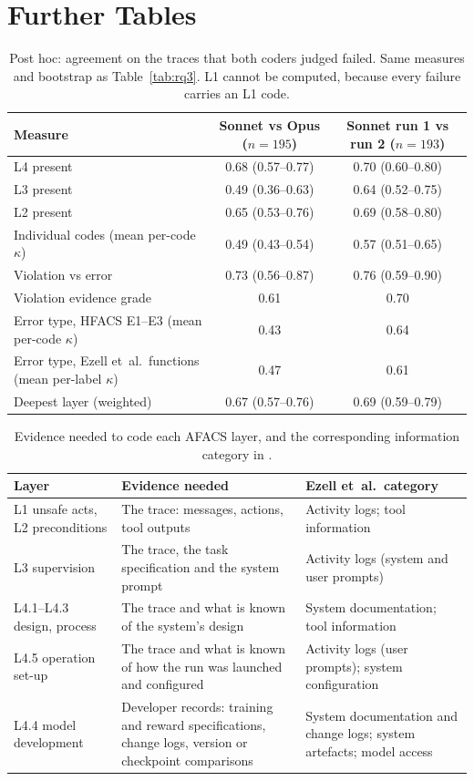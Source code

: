 \documentclass[10pt]{article}
\begin{document}
\section{Further Tables}
\label{app:tables}

\begin{table}[tbp]
\centering
\caption{Post hoc: agreement on the traces that both coders judged failed. Same measures and bootstrap as Table~\ref{tab:rq3}. L1 cannot be computed, because every failure carries an L1 code.}
\label{tab:bothfailed}
\small
\begin{tabular}{@{}lcc@{}}
\toprule
Measure & Sonnet vs Opus ($n=195$) & Sonnet run 1 vs run 2 ($n=193$)\\
\midrule
L4 present & 0.68 (0.57--0.77) & 0.70 (0.60--0.80)\\
L3 present & 0.49 (0.36--0.63) & 0.64 (0.52--0.75)\\
L2 present & 0.65 (0.53--0.76) & 0.69 (0.58--0.80)\\
Individual codes (mean per-code $\kappa$) & 0.49 (0.43--0.54) & 0.57 (0.51--0.65)\\
Violation vs error & 0.73 (0.56--0.87) & 0.76 (0.59--0.90)\\
Violation evidence grade & 0.61 & 0.70\\
Error type, HFACS E1--E3 (mean per-code $\kappa$) & 0.43 & 0.64\\
Error type, Ezell et~al.\ functions (mean per-label $\kappa$) & 0.47 & 0.61\\
Deepest layer (weighted) & 0.67 (0.57--0.76) & 0.69 (0.59--0.79)\\
\bottomrule
\end{tabular}
\end{table}

\begin{table}[tbp]
\centering
\caption{Evidence needed to code each AFACS layer, and the corresponding
information category in \citet{ezell2025incident}.}
\label{tab:evsource}
\small
\begin{tabular}{@{}L{3.4cm}L{6.2cm}L{4.6cm}@{}}
\toprule
Layer & Evidence needed & Ezell et~al.\ category\\
\midrule
L1 unsafe acts, L2 preconditions & The trace: messages, actions, tool outputs & Activity logs; tool information\\
L3 supervision & The trace, the task specification and the system prompt & Activity logs (system and user prompts)\\
L4.1--L4.3 design, process & The trace and what is known of the system's design & System documentation; tool information\\
L4.5 operation set-up & The trace and what is known of how the run was launched and configured & Activity logs (user prompts); system configuration\\
L4.4 model development & Developer records: training and reward specifications, change logs, version or checkpoint comparisons & System documentation and change logs; system artefacts; model access\\
\bottomrule
\end{tabular}
\end{table}
\end{document}
